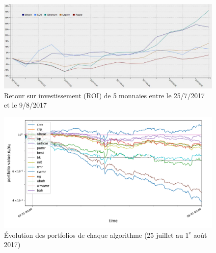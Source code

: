 \documentclass[a4paper, 10pt]{article}
\begin{document}
\begin{figure}[ht!]
\begin{center}
\includegraphics[width=1.0\textwidth]{images/ROI_short.JPG}
\caption{Retour sur investissement (ROI) de 5 monnaies entre le 25/7/2017 et le 9/8/2017}
\label{fig:roi_short}
\end{center}
\end{figure}

\begin{figure}[ht!]
\begin{center}
\includegraphics[width=1.0\textwidth]{images/plot_short.pdf}
\caption{Évolution des portfolios de chaque algorithme (25 juillet au $1^{\text{e}}$ août 2017)}
\label{fig:plot_short}
\end{center}
\end{figure}
\end{document}

